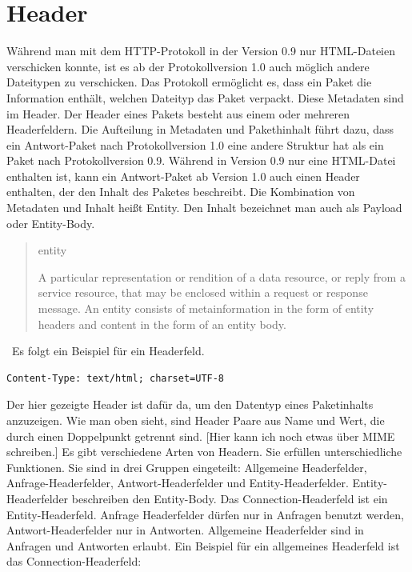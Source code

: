 \documentclass{llncs}
\begin{document}
\section{Header}
Während man mit dem HTTP-Protokoll in der Version 0.9 nur HTML-Dateien verschicken konnte, ist es ab der Protokollversion 1.0 auch möglich andere Dateitypen zu verschicken. Das Protokoll ermöglicht es, dass ein Paket die Information enthält, welchen Dateityp das Paket verpackt. Diese Metadaten sind im Header. Der Header eines Pakets besteht aus einem oder mehreren Headerfeldern. Die Aufteilung in Metadaten und Pakethinhalt führt dazu, dass ein Antwort-Paket nach Protokollversion 1.0 eine andere Struktur hat als ein Paket nach Protokollversion 0.9. Während in Version 0.9 nur eine HTML-Datei enthalten ist, kann ein Antwort-Paket ab Version 1.0 auch einen Header enthalten, der den Inhalt des Paketes beschreibt. Die Kombination von Metadaten und Inhalt heißt Entity. Den Inhalt bezeichnet man auch als Payload oder Entity-Body.
\begin{quote}   entity \linebreak

       A particular representation or rendition of a data resource, or
       reply from a service resource, that may be enclosed within a
       request or response message. An entity consists of
       metainformation in the form of entity headers and content in the
       form of an entity body. \cite{Berners-Lee1996} \end{quote} \
   Es folgt ein Beispiel für ein Headerfeld.
\begin{verbatim}
Content-Type: text/html; charset=UTF-8
\end{verbatim}
Der hier gezeigte Header ist dafür da, um den Datentyp eines Paketinhalts anzuzeigen. Wie man oben sieht, sind Header Paare aus Name und Wert, die durch einen Doppelpunkt getrennt sind. [Hier kann ich noch etwas über MIME schreiben.] \linebreak Es gibt verschiedene Arten von Headern. Sie erfüllen unterschiedliche Funktionen. Sie sind in drei Gruppen eingeteilt: Allgemeine Headerfelder, Anfrage-Headerfelder, Antwort-Headerfelder und Entity-Headerfelder.\cite{Fielding1999} Entity-Headerfelder beschreiben den Entity-Body. Das Connection-Headerfeld ist ein Entity-Headerfeld. Anfrage Headerfelder dürfen nur in Anfragen benutzt werden, Antwort-Headerfelder nur in Antworten.  Allgemeine Headerfelder sind in Anfragen und Antworten erlaubt. Ein Beispiel für ein allgemeines Headerfeld ist das Connection-Headerfeld: 
\end{document}
